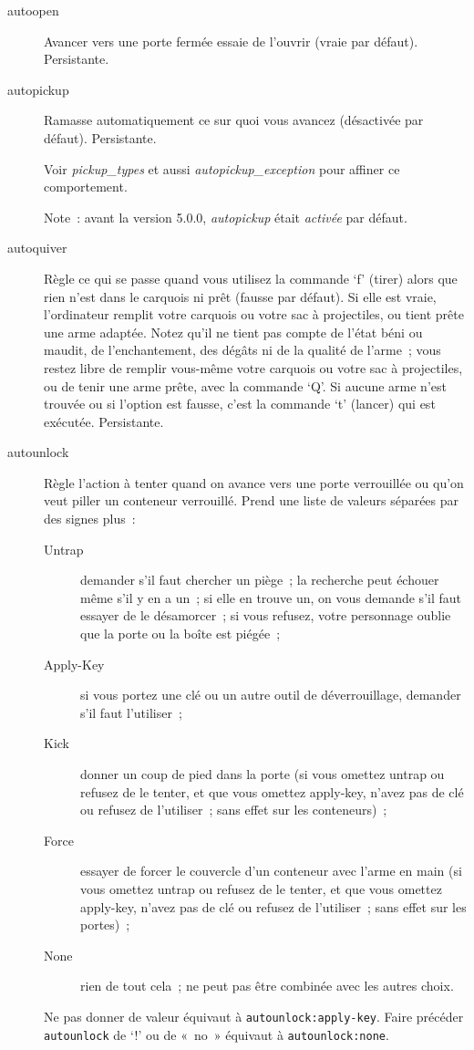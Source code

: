\documentclass[titlepage]{article}
\begin{document}
\begin{description}
\item[{autoopen}]
Avancer vers une porte fermée essaie de l'ouvrir (vraie par défaut).
Persistante.

\item[{autopickup}]
Ramasse automatiquement ce sur quoi vous avancez (désactivée par défaut).
Persistante.


Voir
\textit{pickup\_types}
et aussi
\textit{autopickup\_exception}
pour affiner ce comportement.


Note~: avant la version 5.0.0,
\textit{autopickup}
était \textit{activée} par défaut.

\item[{autoquiver}]
Règle ce qui se passe quand vous utilisez la commande `f' (tirer)
alors que rien n'est dans le carquois ni prêt (fausse par défaut).
Si elle est vraie, l'ordinateur remplit votre carquois ou votre sac à
projectiles, ou tient prête une arme adaptée.
Notez qu'il ne tient pas compte de l'état béni ou maudit, de
l'enchantement, des dégâts ni de la qualité de l'arme~; vous restez libre
de remplir vous-même votre carquois ou votre sac à projectiles, ou de
tenir une arme prête, avec la commande `Q'.
Si aucune arme n'est trouvée ou si l'option est fausse, c'est la commande
`t' (lancer) qui est exécutée.
Persistante.

\item[{autounlock}]
Règle l'action à tenter quand on avance vers une porte verrouillée ou
qu'on veut piller un conteneur verrouillé.
Prend une liste de valeurs séparées par des signes plus~:
\begin{description}
\item[{Untrap}]
demander s'il faut chercher un piège~; la recherche peut échouer même s'il
y en a un~; si elle en trouve un, on vous demande s'il faut essayer de le
désamorcer~; si vous refusez, votre personnage oublie que la porte ou la
boîte est piégée~;
\item[{Apply-Key}]
si vous portez une clé ou un autre outil de déverrouillage, demander s'il
faut l'utiliser~;
\item[{Kick}]
donner un coup de pied dans la porte (si vous omettez untrap ou refusez de
le tenter, et que vous omettez apply-key, n'avez pas de clé ou refusez de
l'utiliser~; sans effet sur les conteneurs)~;
\item[{Force}]
essayer de forcer le couvercle d'un conteneur avec l'arme en main (si vous
omettez untrap ou refusez de le tenter, et que vous omettez apply-key,
n'avez pas de clé ou refusez de l'utiliser~; sans effet sur les
portes)~;
\item[{None}]
rien de tout cela~; ne peut pas être combinée avec les autres choix.
\end{description}
Ne pas donner de valeur équivaut à \texttt{autounlock:apply-key}.
Faire précéder \texttt{autounlock} de `!' ou de «~no~» équivaut
à \texttt{autounlock:none}.



\end{description}
\end{document}
